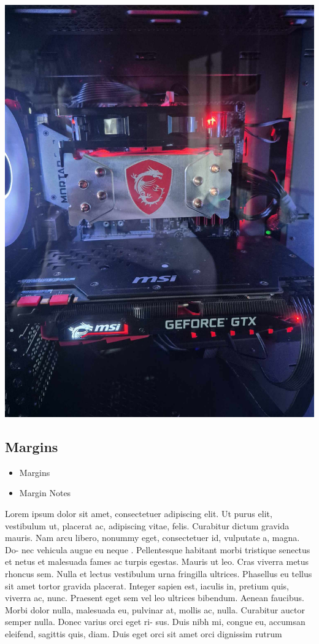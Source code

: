 \documentclass{report}
\begin{document}
\begin{minipage}{0.3\textwidth}
    \lipsum[1]
    \includegraphics[width=\linewidth]{cooler.jpg}
\end{minipage}

\subsection{Margins}
\begin{itemize}
    \item Margins
    \item Margin Notes
\end{itemize}

Lorem ipsum dolor sit amet, consectetuer adipiscing elit.
Ut purus elit, vestibulum ut, placerat ac, adipiscing vitae,
felis. Curabitur dictum gravida mauris. Nam arcu libero,
nonummy eget, consectetuer id, vulputate a, magna. Do-
nec vehicula augue eu neque . Pellentesque habitant morbi
tristique senectus et netus et malesuada fames ac turpis
egestas. Mauris ut leo. Cras viverra metus rhoncus sem.
Nulla et lectus vestibulum urna fringilla ultrices. Phasellus
eu tellus sit amet tortor gravida placerat. Integer sapien
est, iaculis in, pretium quis, viverra ac, nunc. Praesent eget
sem vel leo ultrices bibendum. Aenean faucibus. Morbi
dolor nulla, malesuada eu, pulvinar at, mollis ac, nulla.
Curabitur auctor semper nulla. Donec varius orci eget ri-
sus. Duis nibh mi, congue eu, accumsan eleifend, sagittis
quis, diam. Duis eget orci sit amet orci dignissim rutrum
\end{document}
